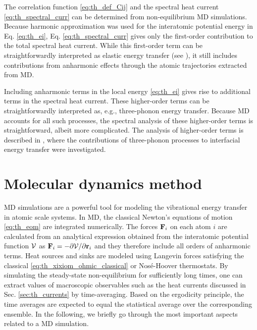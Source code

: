 The correlation function \eqref{eq:th_def_Cij} and the spectral heat current \eqref{eq:th_spectral_curr} can be determined from non-equilibrium MD simulations. Because harmonic approximation was used for the interatomic potential energy in Eq. \eqref{eq:th_ei}, Eq. \eqref{eq:th_spectral_curr} gives only the first-order contribution to the total spectral heat current. While this first-order term can be straightforwardly interpreted as elastic energy transfer (see ), it still includes contributions from anharmonic effects through the atomic trajectories extracted from MD.

Including anharmonic terms in the local energy \eqref{eq:th_ei} gives rise to additional terms in the spectral heat current. These higher-order terms can be straightforwardly interpreted as, e.g., three-phonon energy transfer. Because MD accounts for all such processes, the spectral analysis of these higher-order terms is straightforward, albeit more complicated. The analysis of higher-order terms is described in , where the contributions of three-phonon processes to interfacial energy transfer were investigated. 

\section{Molecular dynamics method}

\label{sec:methods_md}

MD simulations are a powerful tool for modeling the vibrational energy transfer in atomic scale systems. In MD, the classical Newton's equations of motion \eqref{eq:th_eom} are integrated numerically. The forces $\mathbf{F}_i$ on each atom $i$ are calculated from an analytical expression obtained from the interatomic potential function $\mathcal{V}$ as $\mathbf{F}_i=-\partial \mathcal{V}/\partial \mathbf{r}_i$ and they therefore include all orders of anharmonic terms. Heat sources and sinks are modeled using Langevin forces satisfying the classical  \eqref{eq:th_xixiom_ohmic_classical} or Nos\'e-Hoover \cite{nose84,hoover85} thermostats. By simulating the steady-state non-equilibrium for sufficiently long times, one can extract values of macroscopic observables such as the heat currents discussed in Sec. \ref{sec:th_currents} by time-averaging. Based on the ergodicity principle, the time averages are expected to equal the statistical average over the corresponding ensemble. In the following, we briefly go through the most important aspects related to a MD simulation.


